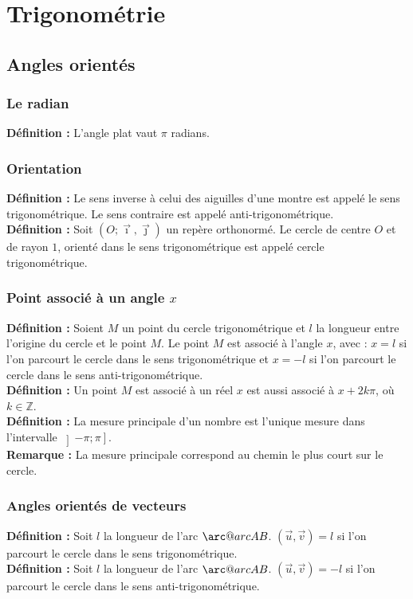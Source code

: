 \documentclass[a4paper,titlepage]{article}
\makeatletter
\let\oldsection\section
\renewcommand\section{\clearpage\oldsection}
\newcommand{\arc@char}{{\usefont{U}{tipa}{m}{n}\symbol{62}}}%
\newcommand{\arc}[1]{\mathpalette\arc@arc{#1}}
\newcommand{\arc@arc}[2]{
    \sbox0{$\m@th#1#2$}
    \vbox{
        \hbox{\resizebox{\wd0}{\height}{\arc@char}}
        \nointerlineskip
        \box0
    }
}
\makeatother
\begin{document}
\section{Trigonométrie}
    \subsection{Angles orientés}
        \subsubsection{Le radian}
            \textbf{Définition :} L’angle plat vaut $\pi$ radians.
        \subsubsection{Orientation}
            \textbf{Définition :} Le sens inverse à celui des aiguilles d’une montre est appelé le sens trigonométrique. Le sens contraire est appelé anti-trigonométrique.
            \\
            \textbf{Définition :} Soit $\left(O;\vec{\imath},\vec{\jmath}\right)$ un repère orthonormé. Le cercle de centre $O$ et de rayon $1$, orienté dans le sens trigonométrique est appelé cercle trigonométrique.
        \subsubsection[Point associé à un angle $x$]{\boldmath Point associé à un angle $x$}
            \textbf{Définition :} Soient $M$ un point du cercle trigonométrique et $l$ la longueur entre l’origine du cercle et le point $M$. Le point $M$ est associé à l’angle $x$, avec : $x=l$ si l’on parcourt le cercle dans le sens trigonométrique et $x=-l$ si l’on parcourt le cercle dans le sens anti-trigonométrique.
            \\
            \textbf{Définition :} Un point $M$ est associé à un réel $x$ est aussi associé à $x+2k\pi$, où $k\in\mathbb{Z}$.
            \\
            \textbf{Définition :} La mesure principale d’un nombre est l’unique mesure dans l'intervalle $\left]-\pi;\pi\right]$.
            \\
            \textbf{Remarque :} La mesure principale correspond au chemin le plus court sur le cercle.
        \subsubsection{Angles orientés de vecteurs}
            \textbf{Définition :} Soit $l$ la longueur de l’arc $\arc{AB}$. $\left(\vec{u},\vec{v}\right)=l$ si l’on parcourt le cercle dans le sens trigonométrique.
            \\
            \textbf{Définition :} Soit $l$ la longueur de l’arc $\arc{AB}$. $\left(\vec{u},\vec{v}\right)=-l$ si l’on parcourt le cercle dans le sens anti-trigonométrique.
\end{document}
